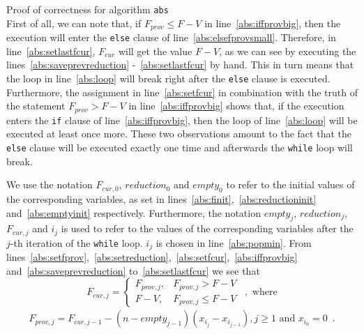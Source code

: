 \begin{sepproof}{Proof of correctness for algorithm \texttt{abs}} \ \\
  First of all, we can note that, if $F_{prov} \leq F - V$ in line~\ref{abs:iffprovbig}, then the execution will enter the
  \texttt{else} clause of line~\ref{abs:elsefprovsmall}. Therefore, in line~\ref{abs:setlastfcur}, $F_{cur}$ will get the
  value $F - V$, as we can see by executing the lines~\ref{abs:saveprevreduction} -~\ref{abs:setlastfcur} by hand. This in
  turn means that the loop in line~\ref{abs:loop} will break right after the \texttt{else} clause is executed. Furthermore,
  the assignment in line~\ref{abs:setfcur} in combination with the truth of the statement $F_{prov} > F - V$ in
  line~\ref{abs:iffprovbig} shows that, if the execution enters the \texttt{if} clause of line~\ref{abs:iffprovbig}, then
  the loop of line~\ref{abs:loop} will be executed at least once more. These two observations amount to the fact that the
  \texttt{else} clause will be executed exactly one time and afterwards the \texttt{while} loop will break.

  We use the notation $F_{cur, 0}$, $reduction_0$ and $empty_0$ to refer to the initial values of the corresponding
  variables, as set in lines~\ref{abs:finit},~\ref{abs:reductioninit} and~\ref{abs:emptyinit} respectively. Furthermore, the
  notation $empty_j$, $reduction_j$, $F_{cur, j}$ and $i_j$ is used to refer to the values of the corresponding variables
  after the $j$-th iteration of the \texttt{while} loop. $i_j$ is chosen in line~\ref{abs:popmin}. From
  lines~\ref{abs:setfprov},~\ref{abs:setreduction},~\ref{abs:setfcur},~\ref{abs:iffprovbig} and~\ref{abs:saveprevreduction}
  to~\ref{abs:setlastfcur} we see that
  \begin{equation*}
    F_{cur, j} =
    \begin{cases}
       F_{prov, j},& F_{prov, j} > F - V \\
       F - V ,& F_{prov, j} \leq F - V
    \end{cases} \enspace, \mbox{ where}
  \end{equation*}
  \begin{equation*}
  \begin{gathered}
    F_{prov, j} = F_{cur, j-1} - \left(n - empty_{j-1}\right)\left(x_{i_j} - x_{i_{j-1}}\right), j \geq 1 \mbox{ and }
    x_{i_0} = 0 \enspace.
  \end{gathered}
  \end{equation*}


\end{sepproof}

